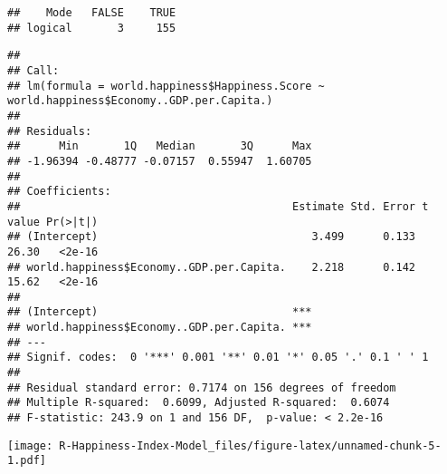 \documentclass[
]{article}
\newenvironment{Shaded}{\begin{snugshade}}{\end{snugshade}}
\newcommand{\CommentTok}[1]{\textcolor[rgb]{0.56,0.35,0.01}{\textit{#1}}}
\newcommand{\FunctionTok}[1]{\textcolor[rgb]{0.00,0.00,0.00}{#1}}
\newcommand{\NormalTok}[1]{#1}
\newcommand{\OtherTok}[1]{\textcolor[rgb]{0.56,0.35,0.01}{#1}}
\newcommand{\SpecialCharTok}[1]{\textcolor[rgb]{0.00,0.00,0.00}{#1}}
\begin{document}
\begin{verbatim}
##    Mode   FALSE    TRUE 
## logical       3     155
\end{verbatim}

\begin{Shaded}
\end{Shaded}

\begin{verbatim}
## 
## Call:
## lm(formula = world.happiness$Happiness.Score ~ world.happiness$Economy..GDP.per.Capita.)
## 
## Residuals:
##      Min       1Q   Median       3Q      Max 
## -1.96394 -0.48777 -0.07157  0.55947  1.60705 
## 
## Coefficients:
##                                          Estimate Std. Error t value Pr(>|t|)
## (Intercept)                                 3.499      0.133   26.30   <2e-16
## world.happiness$Economy..GDP.per.Capita.    2.218      0.142   15.62   <2e-16
##                                             
## (Intercept)                              ***
## world.happiness$Economy..GDP.per.Capita. ***
## ---
## Signif. codes:  0 '***' 0.001 '**' 0.01 '*' 0.05 '.' 0.1 ' ' 1
## 
## Residual standard error: 0.7174 on 156 degrees of freedom
## Multiple R-squared:  0.6099, Adjusted R-squared:  0.6074 
## F-statistic: 243.9 on 1 and 156 DF,  p-value: < 2.2e-16
\end{verbatim}

\begin{Shaded}
\end{Shaded}

\texttt{[image: R-Happiness-Index-Model\_files/figure-latex/unnamed-chunk-5-1.pdf]}
\end{document}
